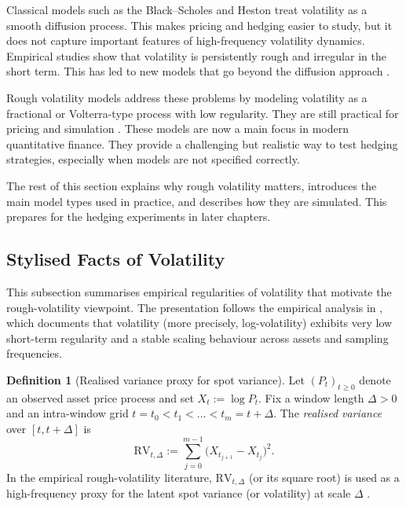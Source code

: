 \documentclass[12pt,a4paper]{article}
\theoremstyle{definition}
\newtheorem{definition}{Definition}[section]
\theoremstyle{plain}
\theoremstyle{remark}
\theoremstyle{plain}
\begin{document}
Classical models such as the Black--Scholes \cite{BlackScholes1973} and Heston \cite{Heston1993} treat volatility as a smooth diffusion process. This makes pricing and hedging easier to study, but it does not capture important features of high-frequency volatility dynamics.
Empirical studies show that volatility is persistently rough and irregular in the short term. This has led to new models that go beyond the diffusion approach \cite{GatheralRough}.

Rough volatility models address these problems by modeling volatility as a fractional or Volterra-type process with low regularity. They are still practical for pricing and simulation \cite{BayerFriz2016,FrizGatheral2020}.
These models are now a main focus in modern quantitative finance. They provide a challenging but realistic way to test hedging strategies, especially when models are not specified correctly.

The rest of this section explains why rough volatility matters, introduces the main model types used in practice, and describes how they are simulated. This prepares for the hedging experiments in later chapters.

\subsection{Stylised Facts of Volatility}
\label{subsec:stylised_facts_volatility}

This subsection summarises empirical regularities of volatility that motivate the rough-volatility viewpoint.
The presentation follows the empirical analysis in \cite{GatheralRough}, which documents that volatility (more precisely, log-volatility) exhibits very low short-term regularity and a stable scaling behaviour across assets and sampling frequencies.

\begin{definition}[Realised variance proxy for spot variance]
\label{def:realised_variance_proxy}
Let $(P_t)_{t\ge 0}$ denote an observed asset price process and set $X_t:=\log P_t$.
Fix a window length $\Delta>0$ and an intra-window grid $t=t_0<t_1<\dots<t_m=t+\Delta$.
The \emph{realised variance} over $[t,t+\Delta]$ is
\[
\mathrm{RV}_{t,\Delta}
:=
\sum_{j=0}^{m-1}\bigl(X_{t_{j+1}}-X_{t_j}\bigr)^2.
\]
In the empirical rough-volatility literature, $\mathrm{RV}_{t,\Delta}$ (or its square root) is used as a high-frequency proxy for the latent spot variance (or volatility) at scale $\Delta$ \cite{GatheralRough}.
\end{definition}
\end{document}
